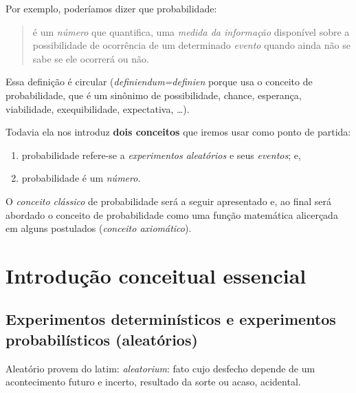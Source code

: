 \documentclass[
]{book}
\providecommand{\tightlist}{%
  \setlength{\itemsep}{0pt}\setlength{\parskip}{0pt}}
\begin{document}
Por exemplo, poderíamos dizer que probabilidade:

\begin{quote}
é um \emph{número} que quantifica, uma \emph{medida da informação} disponível sobre a possibilidade de ocorrência de um determinado \emph{evento} quando ainda não se sabe se ele ocorrerá ou não.
\end{quote}

Essa definição é circular (\emph{definiendum=definien} porque usa o conceito de probabilidade, que é um sinônimo de possibilidade, chance, esperança, viabilidade, exequibilidade, expectativa, \dots).

Todavia ela nos introduz \textbf{dois conceitos} que iremos usar como ponto de partida:

\begin{enumerate}
\def\labelenumi{\arabic{enumi}.}
\tightlist
\item
  probabilidade refere-se a \emph{experimentos aleatórios} e seus \emph{eventos}; e,
\item
  probabilidade é um \emph{número}.
\end{enumerate}

O \emph{conceito clássico} de probabilidade será a seguir apresentado e, ao final será abordado o conceito de probabilidade como uma função matemática alicerçada em alguns postulados (\emph{conceito axiomático}).

\hypertarget{introduuxe7uxe3o-conceitual-essencial}{%
\section{Introdução conceitual essencial}\label{introduuxe7uxe3o-conceitual-essencial}}

\hfill\break

\hypertarget{experimentos-determinuxedsticos-e-experimentos-probabiluxedsticos-aleatuxf3rios}{%
\subsection{Experimentos determinísticos e experimentos probabilísticos (aleatórios)}\label{experimentos-determinuxedsticos-e-experimentos-probabiluxedsticos-aleatuxf3rios}}

\hfill\break

Aleatório provem do latim: \emph{aleatorium}: fato cujo desfecho depende de um acontecimento futuro e incerto, resultado da sorte ou acaso, acidental.

\hfill\break
\end{document}

